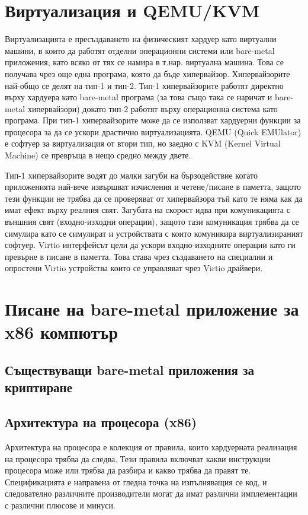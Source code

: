 \section{Виртуализация и QEMU/KVM} \label{virtualization}
Виртуализацията е пресъздаването на физическият хардуер като виртуални машини, в които да работят отделни операционни системи или bare-metal приложения, като всяко от тях се намира в т.нар. виртуална машина. Това се получава чрез още една програма, която да бъде хипервайзор.
Хипервайзорите най-общо се делят на тип-1 и тип-2. Тип-1 хипервайзорите работят директно върху хардуера като bare-metal програма (за това също така се наричат и bare-metal хипервайзори) докато тип-2 работят върху операционна система като програма.
При тип-1 хипервайзорите може да се използват хардуерни функции за процесора за да се ускори драстично виртуализацията. QEMU (Quick EMUlator) е софтуер за виртуализация от втори тип, но заедно с KVM (Kernel Virtual Machine) се превръща в нещо средно между двете.

Тип-1 хипервайзорите водят до малки загуби на бързодействие когато приложенията най-вече извършват изчисления и четене/писане в паметта, защото тези функции не трябва да се проверяват от хипервайзора тъй като те няма как да имат ефект върху реалния свят. Загубата на скорост идва при комуникацията с външния свят (входно-изходни операции), защото тази комуникация трябва да се симулира като се симулират и устройствата с които комуникира виртуализираният софтуер. Virtio интерфейсът цели да ускори входно-изходните операции като ги превърне в писане в паметта. Това става чрез създаването на специални и опростени Virtio устройства които се управляват чрез Virtio драйвери.

\section{Писане на bare-metal приложение за x86 компютър}
  \subsection{Съществуващи bare-metal приложения за криптиране}

  \subsection{Архитектура на процесора (x86)}
  Архитектура на процесора е колекция от правила, които хардуерната реализация на процесора трябва да следва. Тези правила включват какви инструкции процесора може или трябва да разбира и какво трябва да правят те. Спецификацията е направена от гледна точка на изпълняващия се код, и следователно различните производители могат да имат различни имплементации с различни плюсове и минуси.

